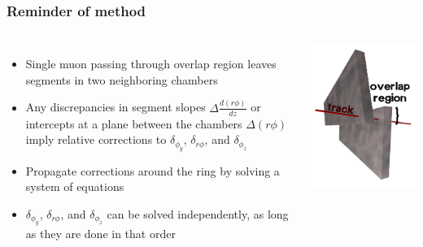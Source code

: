 \documentclass[compress]{beamer}
\begin{document}
\begin{frame}
\frametitle{Reminder of method}
\begin{columns}
\begin{itemize}\setlength{\itemsep}{0.25 cm}
\item Single muon passing through overlap region leaves segments in two neighboring chambers 
\item Any discrepancies in segment slopes $\Delta \frac{d(r\phi)}{dz}$ or intercepts at a plane between the chambers $\Delta (r\phi)$ imply relative corrections to $\delta_{\phi_y}$, $\delta_{r\phi}$, and $\delta_{\phi_z}$
\item Propagate corrections around the ring by solving a system of equations
\item $\delta_{\phi_y}$, $\delta_{r\phi}$, and $\delta_{\phi_z}$ can be solved independently, as long as they are done in that order
\end{itemize}
\begin{center}
\includegraphics[width=0.45\linewidth]{overlaps.png}


\end{center}
\end{columns}
\end{frame}
\end{document}
